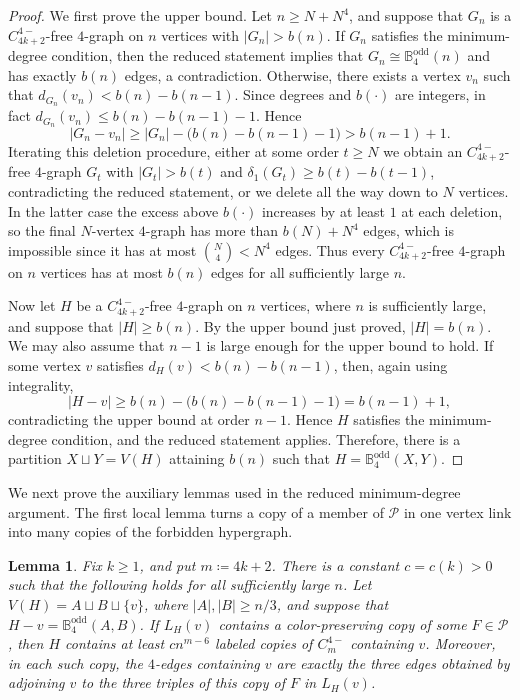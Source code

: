 \documentclass[10pt,a4paper]{article}
\theoremstyle{plain}
\newtheorem{lemma}[lemma]{Lemma}
\theoremstyle{definition}
\begin{document}
\begin{proof}
We first prove the upper bound. Let $n\ge N+N^4$, and suppose that $G_n$ is a
$C_{4k+2}^{4-}$-free $4$-graph on $n$ vertices with $|G_n|>b(n)$. If $G_n$ satisfies the minimum-degree condition, then the reduced statement implies that
$G_n\cong \mathbb{B}_4^{\mathrm{odd}}(n)$ and has exactly $b(n)$ edges, a contradiction.
Otherwise, there exists a vertex $v_n$ such that $d_{G_n}(v_n)<b(n)-b(n-1)$.
Since degrees and $b(\cdot)$ are integers, in fact $d_{G_n}(v_n)\le b(n)-b(n-1)-1$.
Hence
\[
|G_n-v_n|
\ge |G_n|-\bigl(b(n)-b(n-1)-1\bigr)
>b(n-1)+1.
\]
Iterating this deletion procedure, either at some order $t\ge N$ we obtain an
$C_{4k+2}^{4-}$-free $4$-graph $G_t$ with $|G_t|>b(t)$ and
$\delta_1(G_t)\ge b(t)-b(t-1)$, contradicting the reduced statement, or we delete
all the way down to $N$ vertices. In the latter case the excess above $b(\cdot)$
increases by at least $1$ at each deletion, so the final $N$-vertex $4$-graph has
more than $b(N)+N^4$ edges, which is impossible since it has at most $\binom N4<N^4$
edges. Thus every $C_{4k+2}^{4-}$-free $4$-graph on $n$ vertices has at most
$b(n)$ edges for all sufficiently large $n$.

Now let $H$ be a $C_{4k+2}^{4-}$-free $4$-graph on $n$ vertices, where $n$ is sufficiently large, and suppose that $|H|\ge b(n)$. By the upper bound just proved, $|H|=b(n)$. We may also assume that
$n-1$ is large enough for the upper bound to hold. If some vertex $v$ satisfies $d_H(v)<b(n)-b(n-1)$,
then, again using integrality,
\[
 |H-v|\ge b(n)-\bigl(b(n)-b(n-1)-1\bigr)=b(n-1)+1,
\]
contradicting the upper bound at order $n-1$. Hence $H$ satisfies
the minimum-degree condition, and the reduced statement applies. Therefore, there is a partition $X\sqcup Y=V(H)$ attaining $b(n)$ such that $H=\mathbb{B}_4^{\mathrm{odd}}(X,Y)$.
\end{proof}

We next prove the auxiliary lemmas used in the reduced minimum-degree argument.
The first local lemma turns a copy of a member of $\mathcal P$ in one vertex link into many copies of the forbidden hypergraph.

\begin{lemma}\label{lem:P-extension}
Fix $k\ge1$, and put $m\coloneqq4k+2$. There is a constant $c=c(k)>0$ such that the following holds for all sufficiently large $n$. Let $V(H)=A\sqcup B\sqcup\{v\}$, where $|A|,|B|\ge n/3$, and suppose that $H-v=\mathbb{B}_4^{\mathrm{odd}}(A,B)$.
If $L_H(v)$ contains a color-preserving copy of some $F\in\mathcal P$, then $H$ contains at least $c n^{m-6}$ labeled copies of $C_m^{4-}$ containing $v$.  Moreover, in each such copy, the $4$-edges containing $v$ are exactly the three edges obtained by adjoining $v$ to the three triples of this copy of $F$ in $L_H(v)$.
\end{lemma}
\end{document}
